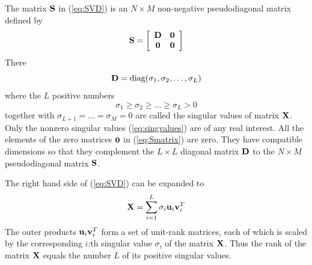 \documentclass[10pt]{article}
\begin{document}
\begin{enumerate}
The matrix ${\bf S}$ in (\ref{eq:SVD}) is an $N \times M$ non-negative pseudodiagonal
matrix defined by 
%
\begin{equation}
{\bf S} = \left[ \begin{array}{cc}
{\bf D} & {\bf 0} \\
{\bf 0} & {\bf 0} \end{array} \right]
\label{eq:Smatrix}
\end{equation}
%
There 
%
\begin{equation}
{\bf D} = \mbox{diag}(\sigma_1,\sigma_2,\ldots,\sigma_L)
\label{eq:Dmatrix}
\end{equation}
%
where the $L$ positive numbers 
%
\begin{equation}
\sigma_1 \geq \sigma_2 \geq \ldots \geq \sigma_L > 0
\label{eq:singvalues}
\end{equation}
%
together with $\sigma_{L+1} = \ldots = \sigma_M = 0$ are called the singular values
of matrix ${\bf X}$. Only the nonzero singular values (\ref{eq:singvalues}) are of
any real interest. All the elements of the zero matrices ${\bf 0}$ in (\ref{eq:Smatrix})
are zero. They have compatible dimensions so that they complement the $L \times L$
diagonal matrix ${\bf D}$ to the $N \times M$ pseudodiagonal matrix ${\bf S}$.

The right hand side of (\ref{eq:SVD}) can be expanded to
%
\begin{equation}
{\bf X} = \sum_{i=1}^L \sigma_i {\bf u}_i {\bf v}_i^T
\label{eq:SVDexp}
\end{equation}
%
The outer products ${\bf u}_i {\bf v}_i^T$ form a set of unit-rank matrices, each
of which is scaled by the corresponding $i$:th singular value $\sigma_i$ of the
matrix ${\bf X}$. Thus the rank of the matrix ${\bf X}$ equals the number $L$ of
its positive singular values.


\end{enumerate}
\end{document}
